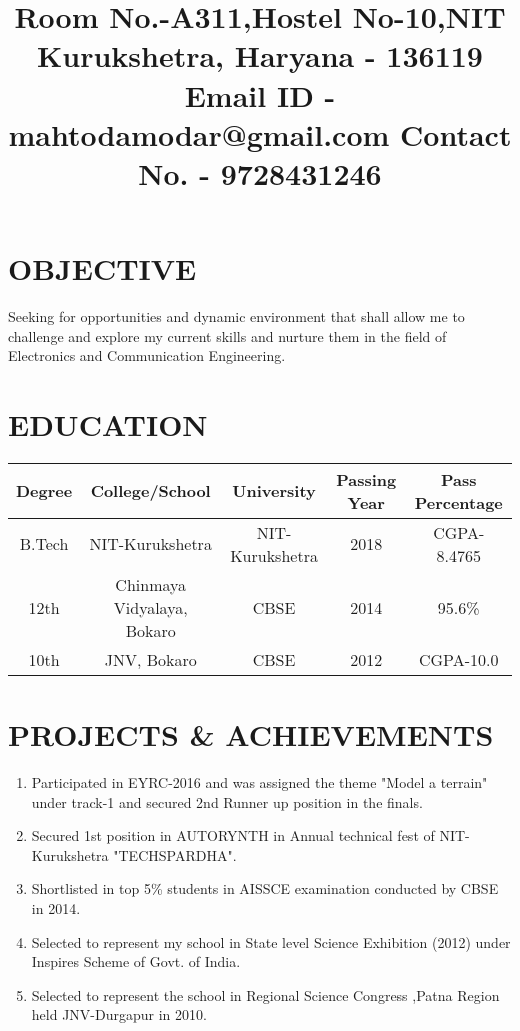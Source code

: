 \documentclass[11pt,a4paper,sans]{moderncv}
\title{   \newline Room No.-A311,\newline Hostel No-10,\newline NIT Kurukshetra, \newline Haryana - 136119 \newline Email ID - mahtodamodar@gmail.com \newline Contact No. - 9728431246}
\begin{document}
\makecvtitle

\section{OBJECTIVE}
Seeking for opportunities and dynamic environment that shall allow me to challenge and explore my current skills and nurture them in the field of Electronics and Communication Engineering.

\section{EDUCATION}
\begin{center}
\begin{tabular}{ |c|c|c|c|c| } 
\hline
Degree & College/School & University & Passing Year & Pass Percentage \\
\hline
\multirow {1}{4em}{B.Tech} & { NIT-Kurukshetra } & { NIT-Kurukshetra } & {2018} & {CGPA-8.4765} \\ 
\hline
\multirow {1}{4em}{12th} & { Chinmaya Vidyalaya, Bokaro } & { CBSE } & {2014} & {95.6\%}\\
\hline
\multirow {1}{4em}{10th} & { JNV, Bokaro } & { CBSE } & {2012} & {CGPA-10.0}\\
\hline
\end{tabular}
\end{center}

\section{PROJECTS \& ACHIEVEMENTS}
\begin{enumerate}
\item Participated in EYRC-2016 and was assigned the theme "Model a terrain" under track-1 and secured 2nd Runner up position in the finals.
\item Secured 1st position in AUTORYNTH in Annual technical fest of NIT-Kurukshetra "TECHSPARDHA".
\item Shortlisted in top 5\% students in AISSCE examination conducted by CBSE in 2014.
\item Selected to represent my school in State level Science Exhibition (2012) under Inspires Scheme of Govt. of India.
\item Selected to represent the school in Regional Science Congress ,Patna Region held JNV-Durgapur in 2010.  
\end{enumerate}
\end{document}

